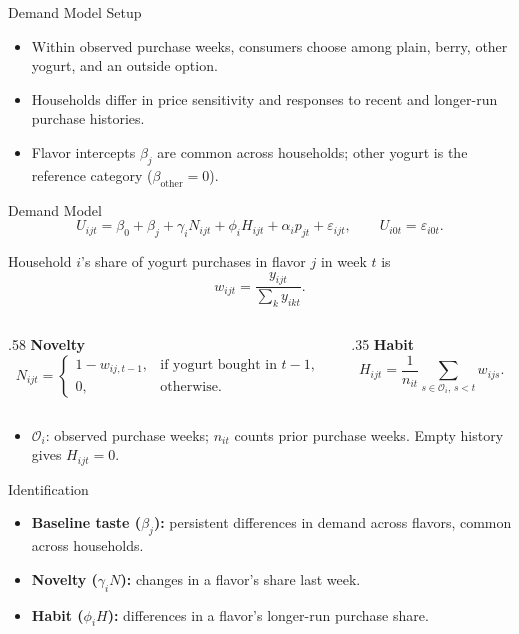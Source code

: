 \documentclass[aspectratio=169,professionalfonts]{beamer}
\newcommand{\shortbuttons}{}
\begin{document}
\gdef\shortbuttons{}
\begin{frame}[label=short-26]{Demand Model Setup}
  \begin{itemize}
    \item Within observed purchase weeks, consumers choose among plain, berry, other yogurt, and an outside option.
    \item Households differ in price sensitivity and responses to recent and
    longer-run purchase histories.
    \item Flavor intercepts $\beta_j$ are common across households; other yogurt is the reference category ($\beta_{\mathrm{other}}=0$).
  \end{itemize}
\end{frame}

\begin{frame}[label=short-27]{Demand Model}
  \footnotesize
  \[
    U_{ijt}=
    \beta_0+\beta_j+
    \gamma_iN_{ijt}+
    \phi_iH_{ijt}
    +\alpha_i p_{jt}+\varepsilon_{ijt},
    \qquad U_{i0t}=\varepsilon_{i0t}.
  \]

  Household $i$'s share of yogurt purchases in flavor $j$ in week $t$ is
  \[
    w_{ijt}=\frac{y_{ijt}}{\sum_k y_{ikt}}.
  \]

  \begin{columns}[T,onlytextwidth]
    \begin{column}{.58\textwidth}
      \textbf{Novelty}
      \[
        N_{ijt}=\begin{cases}
          1-w_{ij,t-1}, & \text{if yogurt bought in $t-1$},\\
          0, & \text{otherwise}.
        \end{cases}
      \]
    \end{column}
    \begin{column}{.35\textwidth}
      \textbf{Habit}
      \[
        H_{ijt}=\frac{1}{n_{it}}\sum_{s\in\mathcal O_i,\,s<t}w_{ijs}.
      \]
    \end{column}
  \end{columns}
  \begin{itemize}
    \item $\mathcal O_i$: observed purchase weeks; $n_{it}$ counts prior purchase weeks. Empty history gives $H_{ijt}=0$.
  \end{itemize}
\end{frame}



\gdef\shortbuttons{}
\begin{frame}[label=short-identification]{Identification}
  \small
  \begin{itemize}
    \item \textbf{Baseline taste ($\beta_j$):} persistent differences in demand across flavors, common across households.
    \item \textbf{Novelty ($\gamma_iN$):} changes in a flavor's share last week.
    \item \textbf{Habit ($\phi_iH$):} differences in a flavor's longer-run purchase share.
  \end{itemize}
\end{frame}
\end{document}
